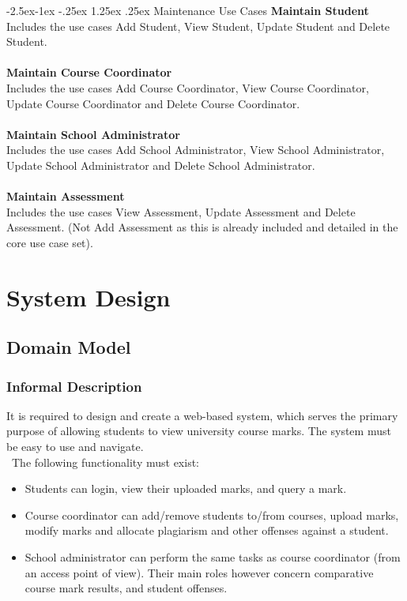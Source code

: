 \documentclass[paper=a4, fontsize=11pt]{scrartcl}
\makeatletter
\numberwithin{equation}{section}		%
\numberwithin{figure}{section}			%
\numberwithin{table}{section}				%
\renewcommand\paragraph{\@startsection{paragraph}{4}{\z@}%
            {-2.5ex\@plus -1ex \@minus -.25ex}%
            {1.25ex \@plus .25ex}%
            {\normalfont\normalsize\bfseries}}
\makeatother
\begin{document}
\paragraph{Maintenance Use Cases}
\textbf{Maintain Student}\\Includes the use cases Add Student, View Student, Update Student and Delete Student.\\\\ \textbf{Maintain Course Coordinator}\\Includes the use cases Add Course Coordinator, View Course Coordinator, Update Course Coordinator and Delete Course Coordinator.\\\\ \textbf{Maintain School Administrator}\\Includes the use cases Add School Administrator, View School Administrator, Update School Administrator and Delete School Administrator.\\\\ \textbf{Maintain Assessment}\\ Includes the use cases View Assessment, Update Assessment and Delete Assessment. (Not Add Assessment as this is already included and detailed in the core use case set).



\section{System Design}

\subsection{Domain Model}

\subsubsection{Informal Description}
It is required to design and create a web-based system, which serves the primary purpose of allowing students to view university course marks. The system must be easy to use and navigate.\\\ The following functionality must exist:

\begin{itemize}
\item Students can login, view their uploaded marks, and query a mark.
\item Course coordinator can add/remove students to/from courses, upload marks, modify marks and allocate plagiarism and other offenses against a student.
\item School administrator can perform the same tasks as course coordinator (from an access point of view). Their main roles however concern comparative course mark results, and student offenses.
\end{itemize}
\end{document}
